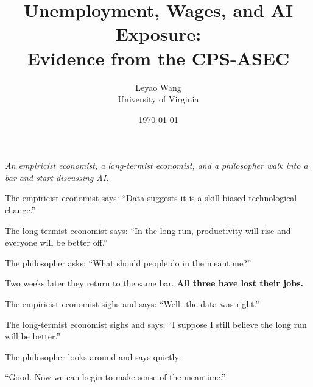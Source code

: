 \documentclass[11pt]{article}
\title{Unemployment, Wages, and AI Exposure:\\
       Evidence from the CPS-ASEC}
\author{Leyao Wang\\
        \small University of Virginia}
\date{\today}
\begin{document}
\maketitle
\doublespacing

\begin{center}
\begin{minipage}{0.75\textwidth}
\itshape
An empiricist economist, a long-termist economist, and a philosopher walk into a bar
and start discussing AI.

\medskip

The empiricist economist says: ``Data suggests it is a skill-biased technological change.''

The long-termist economist says: ``In the long run, productivity will rise and everyone will be better off.''

The philosopher asks: ``What should people do in the meantime?''

\medskip

Two weeks later they return to the same bar. \textbf{All three have lost their jobs.}

\medskip

The empiricist economist sighs and says: ``Well\ldots the data was right.''

The long-termist economist sighs and says: ``I suppose I still believe the long run will be better.''

The philosopher looks around and says quietly:

\medskip

``Good. Now we can begin to make sense of the meantime.''
\end{minipage}
\end{center}
\end{document}

